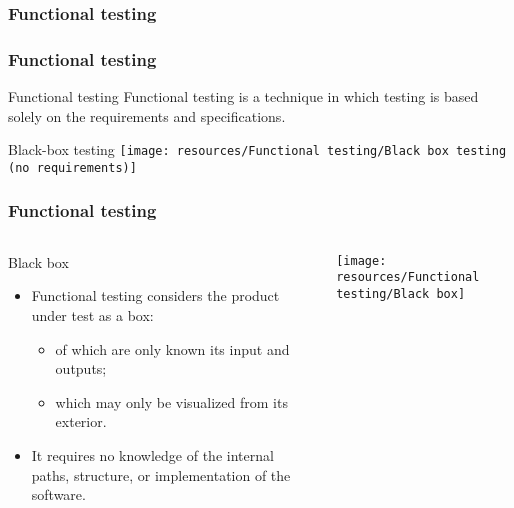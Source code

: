 \begin{frame}[c,parent={cmap:software-testing}, hasprev=false, hasnext=false]
\frametitle{Functional testing}
\label{cmap:functional-testing}

\end{frame}



\begin{frame}[parent={cmap:functional-testing}, hasprev=false, hasnext=true]
\frametitle{Functional testing}
\label{concept:functional-testing}

\begin{block:concept}{Functional testing}
Functional testing is a technique in which testing is based solely on the
requirements and specifications.
\end{block:concept}

\begin{block:fact}{Black-box testing}
	\centering
	\texttt{[image: resources/Functional testing/Black box testing (no requirements)]}
\end{block:fact}
\end{frame}


\begin{frame}[hasprev=true, hasnext=true]
\frametitle{Functional testing}
\label{concept:black-box}

\begin{columns}[t]
\begin{block:fact}{Black box}
\begin{itemize}
	\item Functional testing considers the product under test as a box:
	\begin{itemize}
		\item of which are only known its input and outputs;

		\item which may only be visualized from its exterior.
	\end{itemize}

	\item It requires no knowledge of the internal paths, structure, or
	implementation of the software.
\end{itemize}
\end{block:fact}

\texttt{[image: resources/Functional testing/Black box]}
\end{columns}
\end{frame}



